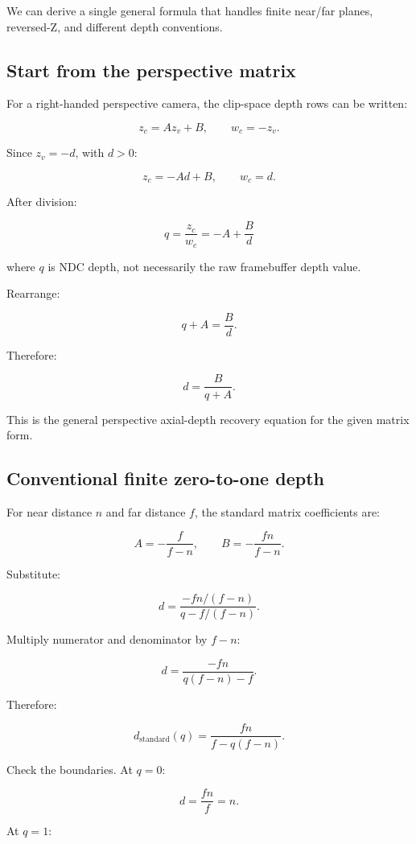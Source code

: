 We can derive a single general formula that handles finite near/far planes, reversed-Z, and different depth conventions.

\subsection{Start from the perspective matrix}\label{02-foundations-ii-ch035-start-from-the-perspective-matrix}

For a right-handed perspective camera, the clip-space depth rows can be written:

\[ z_c=Az_v+B, \qquad w_c=-z_v. \]

Since \(z_v=-d\), with \(d>0\):

\[ z_c=-Ad+B, \qquad w_c=d. \]

After division:

\[ \boxed{ q=\frac{z_c}{w_c}=-A+\frac Bd } \]

where \(q\) is NDC depth, not necessarily the raw framebuffer depth value.

Rearrange:

\[ q+A=\frac Bd. \]

Therefore:

\[ \boxed{ d=\frac B{q+A}. } \]

This is the general perspective axial-depth recovery equation for the given matrix form.

\subsection{Conventional finite zero-to-one depth}\label{02-foundations-ii-ch035-conventional-finite-zero-to-one-depth}

For near distance \(n\) and far distance \(f\), the standard matrix coefficients are:

\[ A=-\frac f{f-n}, \qquad B=-\frac{fn}{f-n}. \]

Substitute:

\[ d= \frac{-fn/(f-n)} {q-f/(f-n)}. \]

Multiply numerator and denominator by \(f-n\):

\[ d=\frac{-fn}{q(f-n)-f}. \]

Therefore:

\[ \boxed{ d_{\mathrm{standard}}(q) = \frac{fn}{f-q(f-n)}. } \]

Check the boundaries. At \(q=0\):

\[ d=\frac{fn}{f}=n. \]

At \(q=1\):

